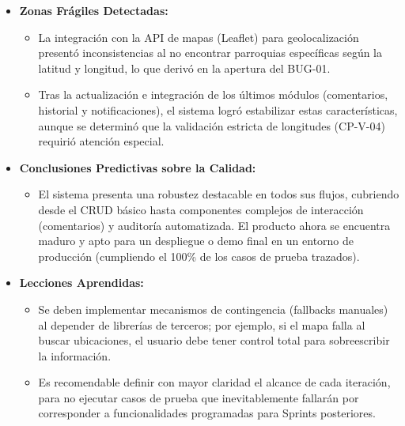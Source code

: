 \begin{itemize}
    \item \textbf{Zonas Frágiles Detectadas:}
    \begin{itemize}
        \item La integración con la API de mapas (Leaflet) para geolocalización presentó inconsistencias al no encontrar parroquias específicas según la latitud y longitud, lo que derivó en la apertura del BUG-01.
        \item Tras la actualización e integración de los últimos módulos (comentarios, historial y notificaciones), el sistema logró estabilizar estas características, aunque se determinó que la validación estricta de longitudes (CP-V-04) requirió atención especial.
    \end{itemize}
    \item \textbf{Conclusiones Predictivas sobre la Calidad:}
    \begin{itemize}
        \item El sistema presenta una robustez destacable en todos sus flujos, cubriendo desde el CRUD básico hasta componentes complejos de interacción (comentarios) y auditoría automatizada. El producto ahora se encuentra maduro y apto para un despliegue o demo final en un entorno de producción (cumpliendo el 100\% de los casos de prueba trazados).
    \end{itemize}
    \item \textbf{Lecciones Aprendidas:}
    \begin{itemize}
        \item Se deben implementar mecanismos de contingencia (fallbacks manuales) al depender de librerías de terceros; por ejemplo, si el mapa falla al buscar ubicaciones, el usuario debe tener control total para sobreescribir la información.
        \item Es recomendable definir con mayor claridad el alcance de cada iteración, para no ejecutar casos de prueba que inevitablemente fallarán por corresponder a funcionalidades programadas para Sprints posteriores.
    \end{itemize}
\end{itemize}
